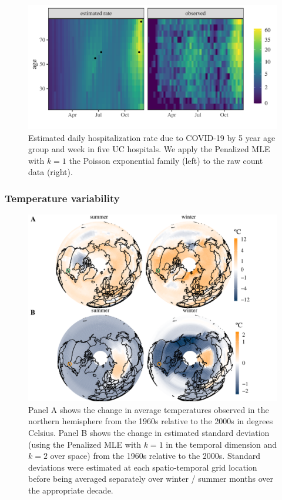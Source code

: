 \documentclass[ejs,noshowframe]{imsart}
\theoremstyle{plain}
\theoremstyle{definition}
\begin{document}
\begin{figure}[t!]
  \centering
  \includegraphics[width=.9\textwidth]{hospitals.pdf}
  \caption{Estimated daily hospitalization rate due to COVID-19 by 5 year age
    group and week in five UC hospitals.  We apply the Penalized MLE with $k=1$
    the Poisson exponential family (left) to the raw count data (right).}
  \label{fig:hospital}
\end{figure}



\subsubsection{Temperature variability}
\label{sec:temperature-ex}

\begin{figure}
  \centering
  \includegraphics[width=.8\textwidth]{both_globes.pdf}
  \caption{Panel A shows the change in average temperatures observed in the northern
    hemisphere from the 1960s relative to the 2000s in degrees Celsius.
    Panel B shows the change in estimated standard deviation (using the Penalized MLE
    with $k=1$ in the temporal dimension and $k=2$ over space) from the 1960s
    relative to the 2000s. Standard deviations were estimated at each
    spatio-temporal grid location before being averaged separately over 
    winter / summer months over the appropriate decade.}
  \label{fig:globes}
\end{figure}
\end{document}
